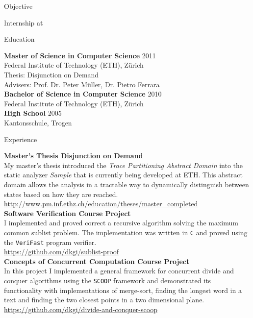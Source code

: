 \documentclass[margin]{res}
\begin{document}
\correspondence

\begin{resume}


	\begin{section}{Objective}

		Internship at \company

	\end{section}


	\begin{section}{Education}

		\textbf{Master of Science in Computer Science} \hfill 2011\\
		Federal Institute of Technology (ETH), Z\"urich\\
		Thesis: Disjunction on Demand\\
		Advisers: Prof. Dr. Peter M\"uller, Dr. Pietro Ferrara\\[12pt]
		\textbf{Bachelor of Science in Computer Science} \hfill 2010\\
		Federal Institute of Technology (ETH), Z\"urich\\[12pt]
		\textbf{High School} \hfill 2005\\
		Kantonsschule, Trogen

	\end{section}


	\begin{section}{Experience}

		\textbf{Master's Thesis Disjunction on Demand}\\
		My master's thesis introduced the \emph{Trace Partitioning Abstract Domain} into the static analyzer \emph{Sample} that is currently being developed at ETH. This abstract domain allows the analysis in a tractable way to dynamically distinguish between states based on how they are reached.\\
		\url{http://www.pm.inf.ethz.ch/education/theses/master_completed}\\[12pt]
		\textbf{Software Verification Course Project}\\
		I implemented and proved correct a recursive algorithm solving the maximum common sublist problem. The implementation was written in \texttt{C} and proved using the \texttt{VeriFast} program verifier.\\[2pt]
		\url{https://github.com/dkgi/sublist-proof}\\[12pt]
		\textbf{Concepts of Concurrent Computation Course Project}\\
		In this project I implemented a general framework for concurrent divide and conquer algorithms using the \texttt{SCOOP} framework and demonstrated its functionality with implementations of merge-sort, finding the longest word in a text and finding the two closest points in a two dimensional plane.\\[2pt]
		\url{https://github.com/dkgi/divide-and-conquer-scoop}


\end{section}
\end{resume}
\end{document}

